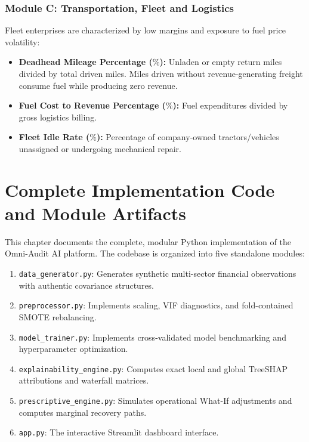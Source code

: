 \documentclass[11pt, a4paper]{article}
\begin{document}
\subsubsection{Module C: Transportation, Fleet and Logistics}
Fleet enterprises are characterized by low margins and exposure to fuel price volatility:
\begin{itemize}
    \item \textbf{Deadhead Mileage Percentage ($\%$):} Unladen or empty return miles divided by total driven miles. Miles driven without revenue-generating freight consume fuel while producing zero revenue.
    \item \textbf{Fuel Cost to Revenue Percentage ($\%$):} Fuel expenditures divided by gross logistics billing.
    \item \textbf{Fleet Idle Rate ($\%$):} Percentage of company-owned tractors/vehicles unassigned or undergoing mechanical repair.
\end{itemize}

\clearpage

\section{Complete Implementation Code and Module Artifacts}

This chapter documents the complete, modular Python implementation of the Omni-Audit AI platform. The codebase is organized into five standalone modules:
\begin{enumerate}
    \item \texttt{data\_generator.py}: Generates synthetic multi-sector financial observations with authentic covariance structures.
    \item \texttt{preprocessor.py}: Implements scaling, VIF diagnostics, and fold-contained SMOTE rebalancing.
    \item \texttt{model\_trainer.py}: Implements cross-validated model benchmarking and hyperparameter optimization.
    \item \texttt{explainability\_engine.py}: Computes exact local and global TreeSHAP attributions and waterfall matrices.
    \item \texttt{prescriptive\_engine.py}: Simulates operational What-If adjustments and computes marginal recovery paths.
    \item \texttt{app.py}: The interactive Streamlit dashboard interface.
\end{enumerate}
\end{document}
